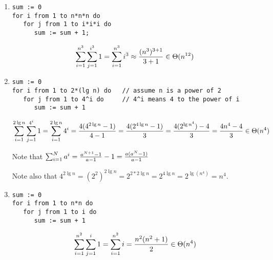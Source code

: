 \begin{enumerate}

\item 
\begin{verbatim}
sum := 0
for i from 1 to n*n*n do
   for j from 1 to i*i*i do
      sum := sum + 1;
\end{verbatim}

  \begin{spaceForAnswer}
    \answerbox
  \end{spaceForAnswer}

\begin{solution}
$$\sum_{i=1}^{n^3} \sum_{j=1}^{i^3} 1 
= \sum_{i=1}^{n^3} i^3 
\approx { (n^3)^{3+1} \over 3+1 }
\in \Theta(n^{12})$$
\end{solution}

\item 
\begin{verbatim}
sum := 0
for i from 1 to 2*(lg n) do   // assume n is a power of 2 
   for j from 1 to 4^i do     // 4^i means 4 to the power of i
      sum := sum + 1
\end{verbatim}

  \begin{spaceForAnswer}
    \answerbox
  \end{spaceForAnswer}
\begin{solution}
$$\sum_{i=1}^{2\lg n} \sum_{j=1}^{4^i} 1 
= \sum_{i=1}^{2\lg n} 4^i 
= {  4(4^{2\lg n} - 1)  \over  4-1 }
= {  4(2^{4\lg n} - 1)  \over 3}
= {  4(2^{\lg n^4}) - 4 \over 3}
= {  4n^4 - 4 \over 3}
\in \Theta(n^4)$$

Note that $\sum_{i=1}^{N} a^i = {a^{N+1} - 1 \over a-1} - 1 = { a(a^N -1) \over a-1}$

Note also that 
$4^{2\lg n} 
= (2^2)^{2\lg n}
= 2^{2*2\lg n} 
= 2^{4\lg n} 
= 2^{\lg( n^4 ) }
= n^4$.

\end{solution}

\item
\begin{verbatim}
sum := 0
for i from 1 to n*n do
   for j from 1 to i do
      sum := sum + 1
\end{verbatim}

  \begin{spaceForAnswer}
    \answerbox
  \end{spaceForAnswer}
\begin{solution}
$$\sum_{i=1}^{n^2} \sum_{j=1}^i 1 = \sum_{i=1}^{n^2} i = {n^2(n^2 + 1) \over 2} \in
\Theta(n^4)$$
\end{solution}


\end{enumerate}
